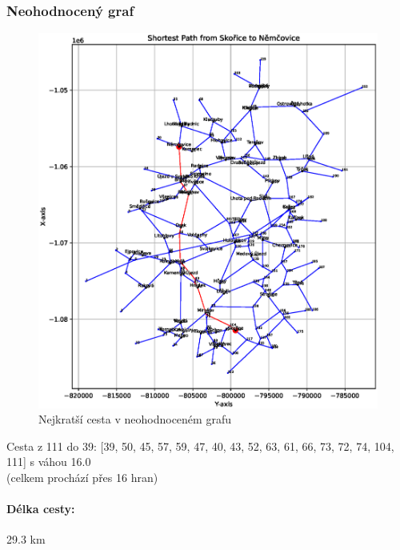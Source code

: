 \subsubsection*{Neohodnocený graf}
\begin{figure}[H]
    \centering
    \includegraphics[width=\textwidth]{images/Figure_1.eps}
    \caption{Nejkratší cesta v neohodnoceném grafu}
\end{figure}
Cesta z 111 do 39: [39, 50, 45, 57, 59, 47, 40, 43, 52, 63, 61, 66, 73, 72, 74, 104, 111] s váhou 16.0 \\
(celkem prochází přes 16 hran)
\paragraph{Délka cesty:} 29.3 km
